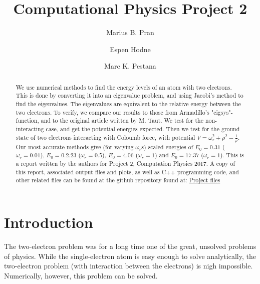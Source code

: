 \documentclass[10pt,showpacs,preprintnumbers,footinbib,amsmath,amssymb,aps,prl,twocolumn,groupedaddress,superscriptaddress,showkeys]{revtex4-1}
\begin{document}
\title[CPP2]{Computational Physics Project 2}

\author{Marius B. Pran}
\author{Espen Hodne} 
\author{Marc K. Pestana}

\begin{abstract}
We use numerical methods to find the energy levels of an atom with two electrons. This is done by converting it into an eigenvalue problem, and using Jacobi's method to find the eigenvalues. The eigenvalues are equivalent to the relative energy between the two electrons. To verify, we compare our results to those from Armadillo's "eigsys"-function, and to the original article written by M. Taut. We test for the non-interacting case, and get the potential energies expected. Then we test for the ground state of two electrons interacting with Coloumb force, with potential $V = \omega_r^2 + \rho^2 - \frac{1}{\rho}$. Our most accurate methods give (for varying $\omega_r$s) scaled energies of $E_0 = 0.31$ ($\omega_r = 0.01$), $E_0 = 0.2.23$ ($\omega_r = 0.5$), $E_0 = 4.06$ ($\omega_r = 1$) and $E_0 = 17.37$ ($\omega_r = 1$). This is a report written by the authors for Project 2, Computation Physics 2017. A copy of this report, associated output files and plots, as well as C++ programming code, and other related files can be found at the github repository found at: \href{https://github.com/ehodne/FYS4150-Shared}{Project files}

\end{abstract}



\maketitle



\section{Introduction}

The two-electron problem was for a long time one of the great, unsolved problems of physics. While the single-electron atom is easy enough to solve analytically, the two-electron problem (with interaction between the electrons) is nigh impossible. Numerically, however, this problem can be solved.
\end{document}

